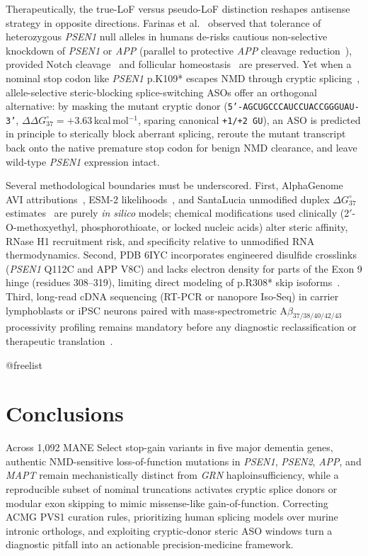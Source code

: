 \documentclass[11pt,a4paper]{article}
\makeatletter
\newcommand{\FloatBarrier}{%
  \par
  \expandafter\ifx\csname @freelist\endcsname\relax\else
    \ifx\@deferlist\@empty\else
      \clearpage
    \fi
  \fi
}
\let\orig@section\section
\renewcommand{\section}{\FloatBarrier\orig@section}
\makeatother
\begin{document}
Therapeutically, the true-LoF versus pseudo-LoF distinction reshapes antisense strategy in opposite directions. Farinas et al.~\cite{farinas2026} observed that tolerance of heterozygous \textit{PSEN1} null alleles in humans de-risks cautious non-selective knockdown of \textit{PSEN1} or \textit{APP} (parallel to protective \textit{APP} cleavage reduction~\cite{jonsson2012}), provided Notch cleavage~\cite{yang2019} and follicular homeostasis~\cite{wang2010} are preserved. Yet when a nominal stop codon like \textit{PSEN1} p.K109* escapes NMD through cryptic splicing~\cite{farinas2026}, allele-selective steric-blocking splice-switching ASOs offer an orthogonal alternative: by masking the mutant cryptic donor (\texttt{5'-AGCUGCCCAUCCUACCGGGUAU-3'}, $\Delta\Delta G^\circ_{37}=+3.63$\,kcal\,mol$^{-1}$, sparing canonical \texttt{+1/+2\,GU}), an ASO is predicted in principle to sterically block aberrant splicing, reroute the mutant transcript back onto the native premature stop codon for benign NMD clearance, and leave wild-type \textit{PSEN1} expression intact.

Several methodological boundaries must be underscored. First, AlphaGenome AVI attributions~\cite{avsec2026,alphagenome_atlas2026}, ESM-2 likelihoods~\cite{lin2023}, and SantaLucia unmodified duplex $\Delta G^\circ_{37}$ estimates~\cite{santalucia1998} are purely \textit{in silico} models; chemical modifications used clinically (2$'$-O-methoxyethyl, phosphorothioate, or locked nucleic acids) alter steric affinity, RNase H1 recruitment risk, and specificity relative to unmodified RNA thermodynamics. Second, PDB 6IYC incorporates engineered disulfide crosslinks (\textit{PSEN1} Q112C and APP V8C) and lacks electron density for parts of the Exon 9 hinge (residues 308--319), limiting direct modeling of p.R308* skip isoforms~\cite{zhou2019}. Third, long-read cDNA sequencing (RT-PCR or nanopore Iso-Seq) in carrier lymphoblasts or iPSC neurons paired with mass-spectrometric A$\beta_{37/38/40/42/43}$ processivity profiling remains mandatory before any diagnostic reclassification or therapeutic translation~\cite{arber2019,farinas2026}.

\section{Conclusions}

Across 1,092 MANE Select stop-gain variants in five major dementia genes, authentic NMD-sensitive loss-of-function mutations in \textit{PSEN1}, \textit{PSEN2}, \textit{APP}, and \textit{MAPT} remain mechanistically distinct from \textit{GRN} haploinsufficiency, while a reproducible subset of nominal truncations activates cryptic splice donors or modular exon skipping to mimic missense-like gain-of-function. Correcting ACMG PVS1 curation rules, prioritizing human splicing models over murine intronic orthologs, and exploiting cryptic-donor steric ASO windows turn a diagnostic pitfall into an actionable precision-medicine framework.
\end{document}
